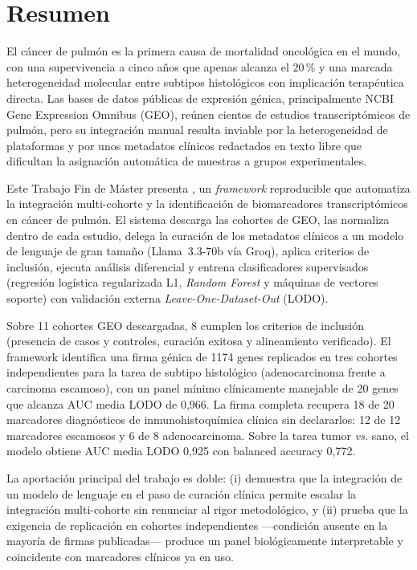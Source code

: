 \thispagestyle{empty}
\chapter*{Resumen}
{}

El cáncer de pulmón es la primera causa de mortalidad oncológica en el mundo,
con una supervivencia a cinco años que apenas alcanza el 20\,\% y una marcada
heterogeneidad molecular entre subtipos histológicos con implicación
terapéutica directa. Las bases de datos públicas de expresión génica,
principalmente NCBI Gene Expression Omnibus (GEO), reúnen cientos de estudios
transcriptómicos de pulmón, pero su integración manual resulta inviable por
la heterogeneidad de plataformas y por unos metadatos clínicos redactados en
texto libre que dificultan la asignación automática de muestras a grupos
experimentales.

Este Trabajo Fin de Máster presenta \framework, un \emph{framework}
reproducible que automatiza la integración multi-cohorte y la identificación
de biomarcadores transcriptómicos en cáncer de pulmón. El sistema descarga
las cohortes de GEO, las normaliza dentro de cada estudio, delega la
curación de los metadatos clínicos a un modelo de lenguaje de gran tamaño
(Llama~3.3-70b vía Groq), aplica criterios de inclusión, ejecuta análisis
diferencial y entrena clasificadores supervisados (regresión logística
regularizada L1, \emph{Random Forest} y máquinas de vectores soporte) con
validación externa \emph{Leave-One-Dataset-Out} (LODO).

Sobre 11 cohortes GEO descargadas, 8 cumplen los criterios de inclusión
(presencia de casos y controles, curación exitosa y alineamiento
verificado). El framework identifica una firma génica de 1174 genes
replicados en tres cohortes independientes para la tarea de subtipo
histológico (adenocarcinoma frente a carcinoma escamoso), con un panel
mínimo clínicamente manejable de 20 genes que alcanza AUC media LODO de
0,966. La firma completa recupera 18 de 20 marcadores diagnósticos de
inmunohistoquímica clínica sin declararlos: 12 de 12 marcadores escamosos
y 6 de 8 adenocarcinoma. Sobre la tarea tumor \emph{vs.} sano, el modelo
obtiene AUC media LODO 0,925 con balanced accuracy 0,772.

La aportación principal del trabajo es doble: (i) demuestra que la
integración de un modelo de lenguaje en el paso de curación clínica permite
escalar la integración multi-cohorte sin renunciar al rigor metodológico, y
(ii) prueba que la exigencia de replicación en cohortes independientes
—condición ausente en la mayoría de firmas publicadas— produce un panel
biológicamente interpretable y coincidente con marcadores clínicos ya en uso.

